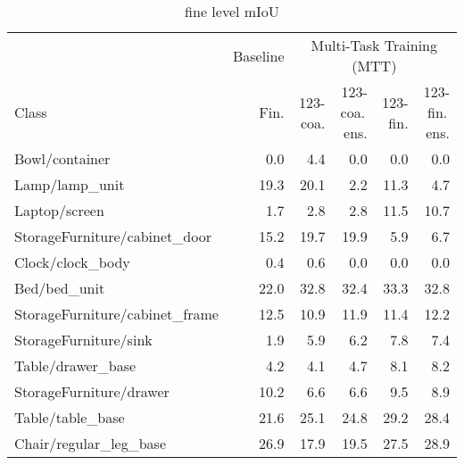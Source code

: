 
\begin{table}[!h]
\caption{fine level mIoU}
\centering
\begin{tabular}{lrrrrr}
\toprule
 &  \multicolumn{1}{c}{Baseline} & \multicolumn{4}{c}{Multi-Task Training (MTT)} \\
 \cmidrule{3-6}
Class 			  &  	 Fin. &  	123-coa. &  		123-coa.\,ens. &  	  123-fin. &  123-fin.\,ens. \\
\midrule
Bowl/container                 &            0.0 &             4.4 &                     0.0 &           0.0 &                   0.0 \\
Lamp/lamp\_unit                 &           19.3 &            20.1 &                     2.2 &          11.3 &                   4.7 \\
Laptop/screen                  &            1.7 &             2.8 &                     2.8 &          11.5 &                  10.7 \\
StorageFurniture/cabinet\_door  &           15.2 &            19.7 &                    19.9 &           5.9 &                   6.7 \\
Clock/clock\_body               &            0.4 &             0.6 &                     0.0 &           0.0 &                   0.0 \\
Bed/bed\_unit                   &           22.0 &            32.8 &                    32.4 &          33.3 &                  32.8 \\
StorageFurniture/cabinet\_frame &           12.5 &            10.9 &                    11.9 &          11.4 &                  12.2 \\
StorageFurniture/sink          &            1.9 &             5.9 &                     6.2 &           7.8 &                   7.4 \\
Table/drawer\_base              &            4.2 &             4.1 &                     4.7 &           8.1 &                   8.2 \\
StorageFurniture/drawer        &           10.2 &             6.6 &                     6.6 &           9.5 &                   8.9 \\
Table/table\_base               &           21.6 &            25.1 &                    24.8 &          29.2 &                  28.4 \\
Chair/regular\_leg\_base         &           26.9 &            17.9 &                    19.5 &          27.5 &                  28.9 \\

\end{tabular}
\end{table}
